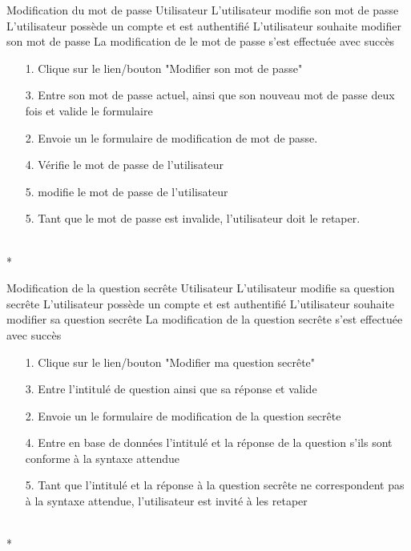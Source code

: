 \documentclass[a4paper,11pt,french]{article}
\begin{document}
\fiche
	{Modification du mot de passe}
	{Utilisateur}
	{L'utilisateur modifie son mot de passe}
	{L'utilisateur possède un compte et est authentifié}
	{L'utilisateur souhaite modifier son mot de passe}
	{La modification de le mot de passe s'est effectuée avec succès}
	{\begin{itemize}
	      \item[]
		\item[1.] Clique sur le lien/bouton "Modifier son mot de passe"
        \item[3.] Entre son mot de passe actuel, ainsi que son nouveau mot de 
        passe deux fois et valide le formulaire
	\end{itemize}
	}
	{\begin{itemize}
        \item[]
		\item[2.] Envoie un le formulaire de modification de mot de passe.
		\item[4.] Vérifie le mot de passe de l'utilisateur
        \item [5.] modifie le mot de passe de l'utilisateur
	\end{itemize}
	}
	{}
\flots
    {\begin{itemize}
    \item[]
    \item[5.] Tant que le mot de passe est invalide, l'utilisateur doit le retaper.
    \end{itemize}
    }
	{}
\\*

\fiche
	{Modification de la question secrête}
	{Utilisateur}
	{L'utilisateur modifie sa question secrête}
	{L'utilisateur possède un compte et est authentifié}
	{L'utilisateur souhaite modifier sa question secrête}
	{La modification de la question secrête s'est effectuée avec succès}
	{\begin{itemize}
		\item[1.] Clique sur le lien/bouton "Modifier ma question secrête"
        \item[3.] Entre l'intitulé de question ainsi que sa réponse et valide
	\end{itemize}
	}
	{\begin{itemize}
        \item[]
		\item[2.] Envoie un le formulaire de modification de la question
		secrête
		\item[4.] Entre en base de données l'intitulé et la réponse de la 
		question s'ils sont conforme à la syntaxe attendue
	\end{itemize}
	}
	{}
\flots
    {\begin{itemize}
    \item[]
    \item[5.] Tant que l'intitulé et la réponse à la  question secrête ne 
    correspondent pas à la syntaxe attendue, l'utilisateur est invité à les 
    retaper 
    \end{itemize}
    }
	{}
\\*
\end{document}
